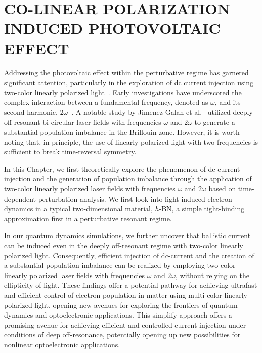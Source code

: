 \chapter{CO-LINEAR POLARIZATION INDUCED PHOTOVOLTAIC EFFECT \label{ch:ch3}} 
Addressing the photovoltaic effect within the perturbative regime has garnered significant
attention, particularly in the exploration of dc current injection using two-color linearly
polarized
light~\cite{PhysRevLett.74.3596,PhysRevLett.76.1703,PhysRevLett.78.306,Sun2010,PhysRevB.100.075202,HeideBoolakeeEcksteinHommelhoff+2021+3701+3707,PhysRevLett.123.067402}.
Early investigations have underscored the complex interaction between a fundamental frequency, denoted as $\omega$, and its second harmonic, $2\omega$~\cite{PhysRevLett.74.3596,PhysRevLett.76.1703,PhysRevLett.78.306}. 
A notable study by Jimenez-Galan et al.~\cite{Jimenez-Galan2020} utilized deeply off-resonant bi-circular laser fields with frequencies $\omega$ and $2\omega$ to generate a substantial population imbalance in the Brillouin zone. However, it is worth noting that, in principle, the use of linearly polarized light with two frequencies is sufficient to break time-reversal symmetry.

In this Chapter, we first theoretically explore the phenomenon of dc-current injection and the
generation of population imbalance through the application of two-color linearly polarized laser
fields with frequencies $\omega$ and $2\omega$ based on time-dependent perturbation analysis.
We first look into light-induced electron dynamics in a typical two-dimensional material, $h$-BN, a simple tight-binding approximation first in a perturbative resonant regime.

In our quantum dynamics simulations, we further uncover that ballistic current can be induced even
in the deeply off-resonant regime with two-color linearly polarized light.  Consequently, efficient
injection of dc-current and the creation of a substantial population imbalance can be realized by
employing two-color linearly polarized laser fields with frequencies $\omega$ and $2\omega$,
without relying on the ellipticity of light. These findings offer a potential pathway for achieving
ultrafast and efficient control of electron population in matter using multi-color linearly
polarized light, opening new avenues for exploring the frontiers of quantum dynamics and
optoelectronic applications. This simplify approach offers a promising avenue for achieving efficient and controlled current injection under conditions of deep off-resonance, potentially opening up new possibilities for nonlinear optoelectronic applications.

